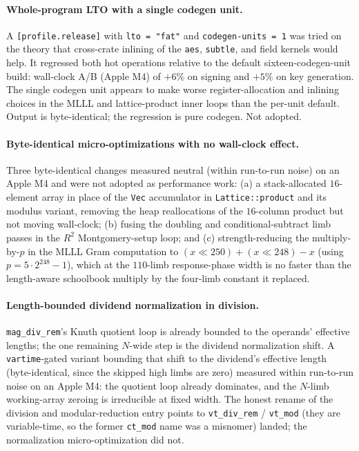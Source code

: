 \paragraph{Whole-program LTO with a single codegen unit.}
A \texttt{[profile.release]} with \texttt{lto = "fat"} and
\texttt{codegen-units = 1} was tried on the theory that cross-crate
inlining of the \texttt{aes}, \texttt{subtle}, and field kernels would
help.  It regressed both hot operations relative to the default
sixteen-codegen-unit build: wall-clock A/B (Apple M4) of $+6\%$ on
signing and $+5\%$ on key generation.  The single codegen unit appears
to make worse register-allocation and inlining choices in the MLLL and
lattice-product inner loops than the per-unit default.  Output is
byte-identical; the regression is pure codegen.  Not adopted.

\paragraph{Byte-identical micro-optimizations with no wall-clock
effect.}
Three byte-identical changes measured neutral (within run-to-run noise)
on an Apple M4 and were not adopted as performance work: (a) a
stack-allocated $16$-element array in place of the \texttt{Vec}
accumulator in \texttt{Lattice::product} and its modulus variant,
removing the heap reallocations of the $16$-column product but not
moving wall-clock; (b) fusing the doubling and conditional-subtract
limb passes in the $R^2$ Montgomery-setup loop; and
(c) strength-reducing the multiply-by-$p$ in the MLLL Gram computation
to $(x \ll 250) + (x \ll 248) - x$ (using $p = 5\cdot 2^{248} - 1$),
which at the $110$-limb response-phase width is no faster than the
length-aware schoolbook multiply by the four-limb constant it
replaced.

\paragraph{Length-bounded dividend normalization in division.}
\texttt{mag\_div\_rem}'s Knuth quotient loop is already bounded to the
operands' effective lengths; the one remaining $N$-wide step is the
dividend normalization shift.  A \texttt{vartime}-gated variant bounding
that shift to the dividend's effective length (byte-identical, since the
skipped high limbs are zero) measured within run-to-run noise on an
Apple M4: the quotient loop already dominates, and the $N$-limb
working-array zeroing is irreducible at fixed width.  The honest rename
of the division and modular-reduction entry points to
\texttt{vt\_div\_rem} / \texttt{vt\_mod} (they are variable-time, so the
former \texttt{ct\_mod} name was a misnomer) landed; the normalization
micro-optimization did not.

